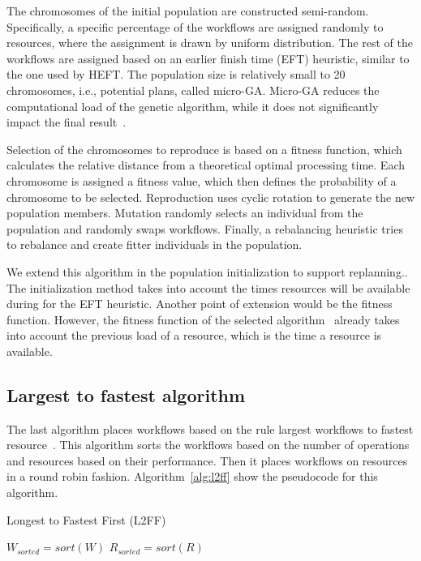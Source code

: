 The chromosomes of the initial population are constructed semi-random.
Specifically, a specific percentage of the workflows are assigned randomly to resources, where the assignment is drawn by uniform distribution.
The rest of the workflows are assigned based on an earlier finish time (EFT) heuristic, similar to the one used by HEFT.
The population size is relatively small to 20 chromosomes, i.e., potential plans, called micro-GA.
Micro-GA reduces the computational load of the genetic algorithm, while it does not significantly impact the final result~\cite{zomaya2001observations}.

Selection of the chromosomes to reproduce is based on a fitness function, which calculates the relative distance from a theoretical optimal processing time.
Each chromosome is assigned a fitness value, which then defines the probability of a chromosome to be selected.
Reproduction uses cyclic rotation to generate the new population members.
Mutation randomly selects an individual from the population and randomly swaps workflows.
Finally, a rebalancing heuristic tries to rebalance and create fitter individuals in the population.

We extend this algorithm in the population initialization to support replanning..
The initialization method takes into account the times resources will be available during for the EFT heuristic.
Another point of extension would be the fitness function.
However, the fitness function of the selected algorithm~\cite{page2005algorithm} already takes into account the previous load of a resource, which is the time a resource is available.

\subsection{Largest to fastest algorithm}
\label{algo:l2ff}
The last algorithm places workflows based on the rule largest workflows to fastest resource~\cite{balasubramanian2019programming}.
This algorithm sorts the workflows based on the number of operations and resources based on their performance.
Then it places workflows on resources in a round robin fashion.
Algorithm~\ref{alg:l2ff} show the pseudocode for this algorithm.

\begin{algorithm}[ht]
    \caption{Longest to Fastest First (L2FF)}
    \label{alg:l2ff}
    \begin{algorithmic}[1]
        \State \texttt{$W_{sorted}=sort(W)$} 
        \State \texttt{$R_{sorted}=sort(R)$}
        \EndFor
        \EndProcedure
    \end{algorithmic}
\end{algorithm}

